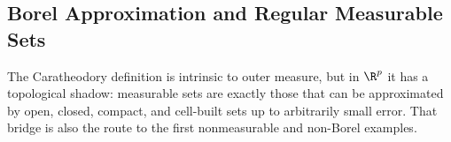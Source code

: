 \subsection{Borel Approximation and Regular Measurable Sets}
%

The Caratheodory definition is intrinsic to outer measure, but in $\R^p$ it has a topological shadow: measurable sets are exactly those that can be approximated by open, closed, compact, and cell-built sets up to arbitrarily small error. That bridge is also the route to the first nonmeasurable and non-Borel examples.

